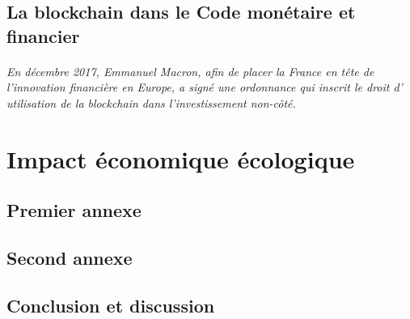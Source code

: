 \documentclass[12pt, a4paper, oneside]{book}
\begin{document}
    \chapter{La blockchain dans le Code monétaire et financier}

    \paragraph{En décembre 2017, Emmanuel Macron, afin de placer la France en tête de l'innovation financière en Europe, a signé une ordonnance qui inscrit le droit d'
    utilisation de la blockchain dans l'investissement non-côté.}

    \part{Impact économique écologique}
 
    \appendix
 
    \chapter{Premier annexe}
    \chapter{Second annexe}
 
    
    \backmatter
 
    \chapter{Conclusion et discussion}
 
    
    \tableofcontents

    
    

 
\end{document}
